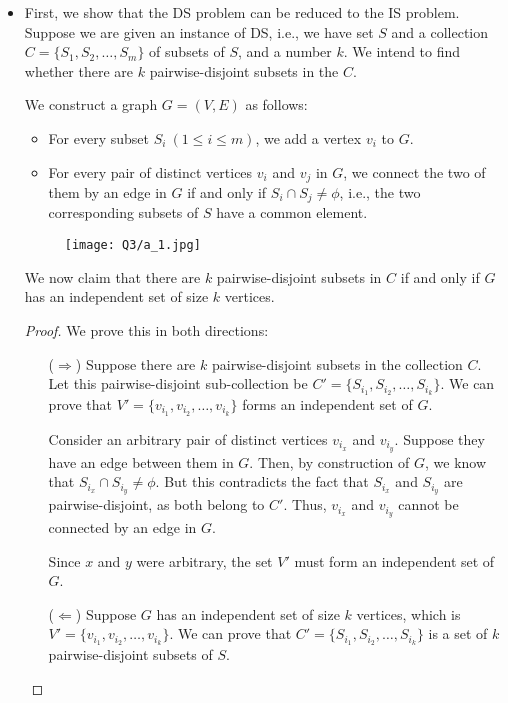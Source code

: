 \documentclass[11pt, fleqn]{article}
\begin{document}
\begin{itemize}
    \item First, we show that the DS problem can be reduced to the IS problem. Suppose we are given an instance of DS, i.e., we have set $S$ and a collection $C = \{S_1, S_2, \dots, S_m\}$ of subsets of $S$, and a number $k$. We intend to find whether there are $k$ pairwise-disjoint subsets in the $C$.
    
    We construct a graph $G = (V, E)$ as follows:
    \begin{itemize}
        \item For every subset $S_i \ (1 \leq i \leq m)$, we add a vertex $v_i$ to $G$.
        \item For every pair of distinct vertices $v_i$ and $v_j$ in $G$, we connect the two of them by an edge in $G$ if and only if $S_i \cap S_j \neq \phi$, i.e., the two corresponding subsets of $S$ have a common element.
    \end{itemize}
    \begin{figure}[H]
        \texttt{[image: Q3/a\_1.jpg]}
    \end{figure}
    We now claim that there are $k$ pairwise-disjoint subsets in $C$ if and only if $G$ has an independent set of size $k$ vertices.
    \begin{proof}
        We prove this in both directions:
        \begin{itemize}
            \item[($\Rightarrow$)]
            Suppose there are $k$ pairwise-disjoint subsets in the collection $C$. Let this pairwise-disjoint sub-collection be $C' = \{S_{i_1}, S_{i_2}, \dots, S_{i_k}\}$. We can prove that $V' = \{v_{i_1}, v_{i_2}, \dots, v_{i_k}\}$ forms an independent set of $G$.
            
            Consider an arbitrary pair of distinct vertices $v_{i_x}$ and $v_{i_y}$. Suppose they have an edge between them in $G$. Then, by construction of $G$, we know that $S_{i_x} \cap S_{i_y} \neq \phi$. But this contradicts the fact that $S_{i_x}$ and $S_{i_y}$ are pairwise-disjoint, as both belong to $C'$. Thus, $v_{i_x}$ and $v_{i_y}$ cannot be connected by an edge in $G$.
            
            Since $x$ and $y$ were arbitrary, the set $V'$ must form an independent set of $G$.
            \item[($\Leftarrow$)]
            Suppose $G$ has an independent set of size $k$ vertices, which is $V' = \{v_{i_1}, v_{i_2}, \dots, v_{i_k}\}$. We can prove that $C' = \{S_{i_1}, S_{i_2}, \dots, S_{i_k}\}$ is a set of $k$ pairwise-disjoint subsets of $S$.
            

\end{itemize}
\end{proof}
\end{itemize}
\end{document}
